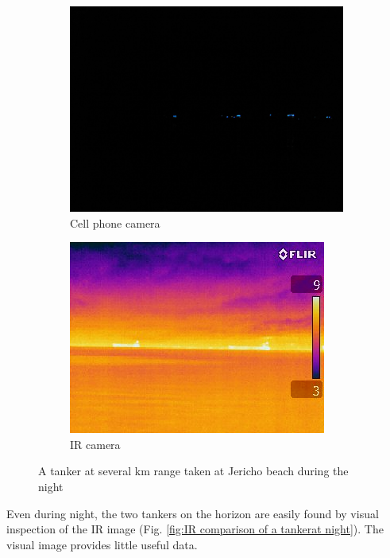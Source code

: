 \begin{figure}[H]
\centering
\begin{subfigure}{.5\textwidth}
  \centering
  \includegraphics[width=.8\linewidth]{"./image/jericho-night-tankers-visible"}
  \caption{Cell phone camera}
  \label{fig:sub1}
\end{subfigure}%
\begin{subfigure}{.5\textwidth}
  \centering
  \includegraphics[width=.8\linewidth]{"./image/jericho-night-tankers-ir"}
  \caption{IR camera}
  \label{fig:sub2}
\end{subfigure}
\caption{A tanker at several km range taken at Jericho beach during the night}
\label{fig:IR comparison of a tanker at night}
\end{figure}

Even during night, the two tankers on the horizon are easily found by visual inspection of the IR image (Fig. \ref{fig:IR comparison of a tankerat night}). The visual image provides little useful data.

